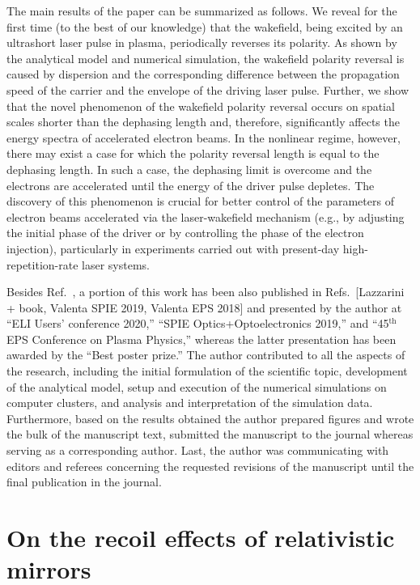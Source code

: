\documentclass[10pt, twoside, a4paper, openright]{report}
\newcommand{\q}[1]{``#1''} %
\begin{document}
The main results of the paper can be summarized as follows. We reveal for the first time (to the best of our knowledge) that the wakefield, being excited by an ultrashort laser pulse in plasma, periodically reverses its polarity. As shown by the analytical model and numerical simulation, the wakefield polarity reversal is caused by dispersion and the corresponding difference between the propagation speed of the carrier and the envelope of the driving laser pulse. Further, we show that the novel phenomenon of the wakefield polarity reversal occurs on spatial scales shorter than the dephasing length and, therefore, significantly affects the energy spectra of accelerated electron beams. In the nonlinear regime, however, there may exist a case for which the polarity reversal length is equal to the dephasing length. In such a case, the dephasing limit is overcome and the electrons are accelerated until the energy of the driver pulse depletes. The discovery of this phenomenon is crucial for better control of the parameters of electron beams accelerated via the laser-wakefield mechanism (e.g., by adjusting the initial phase of the driver or by controlling the phase of the electron injection), particularly in experiments carried out with present-day high-repetition-rate laser systems.

Besides Ref.~, a portion of this work has been also published in Refs.~[Lazzarini + book, Valenta SPIE 2019, Valenta EPS 2018] and presented by the author at \q{ELI Users' conference 2020,} \q{SPIE Optics+Optoelectronics 2019,} and \q{45$ ^{\mathrm{th}} $ EPS Conference on Plasma Physics,} whereas the latter presentation has been awarded by the \q{Best poster prize.} The author contributed to all the aspects of the research, including the initial formulation of the scientific topic, development of the analytical model, setup and execution of the numerical simulations on computer clusters, and analysis and interpretation of the simulation data. Furthermore, based on the results obtained the author prepared figures and wrote the bulk of the manuscript text, submitted the manuscript to the journal whereas serving as a corresponding author. Last, the author was communicating with editors and referees concerning the requested revisions of the manuscript until the final publication in the journal.

\section{On the recoil effects of relativistic mirrors \label{sec:on_the_recoil_effects_of_relativistic_mirrors}}
%
\end{document}
